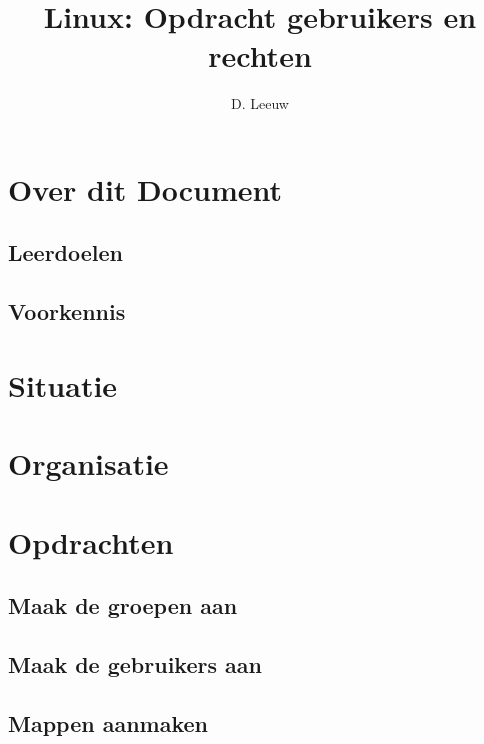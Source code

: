 \documentclass[a4paper,12pt,twoside,openright,titlepage]{article}
\author{D. Leeuw}
\title{Linux: Opdracht gebruikers en rechten}
\date{\today\\
\vfill
\raggedright
\copyright\ 2026 Dennis Leeuw\\
}
\begin{document}

\maketitle


\section{Over dit Document}
\subsection{Leerdoelen}

\subsection{Voorkennis}





\section{Situatie}


\section{Organisatie}


\section{Opdrachten}
\subsection{Maak de groepen aan}

\subsection{Maak de gebruikers aan}

\subsection{Mappen aanmaken}

\end{document}
